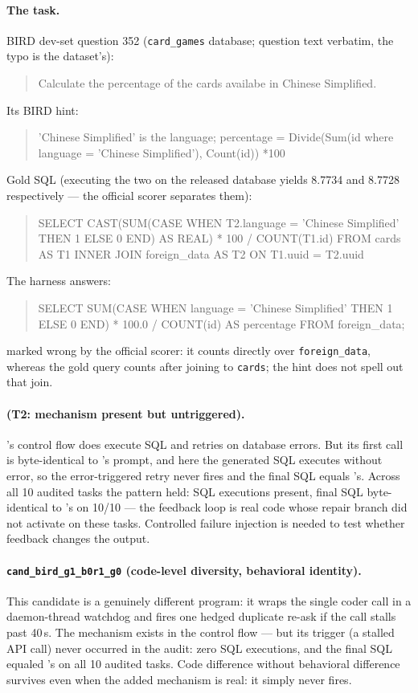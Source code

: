 \paragraph{The task.} BIRD dev-set question 352 (\texttt{card\_games}
database; question text verbatim, the typo is the dataset's):
\begin{quote}\small\ttfamily
Calculate the percentage of the cards availabe in Chinese Simplified.
\end{quote}
Its BIRD hint:
\begin{quote}\small\ttfamily
'Chinese Simplified' is the language; percentage = Divide(Sum(id where
language = 'Chinese Simplified'), Count(id)) *100
\end{quote}
Gold SQL (executing the two on the released database yields 8.7734 and
8.7728 respectively --- the official scorer separates them):
\begin{quote}\small\ttfamily
SELECT CAST(SUM(CASE WHEN T2.language = 'Chinese Simplified' THEN 1 ELSE 0
END) AS REAL) * 100 / COUNT(T1.id) FROM cards AS T1 INNER JOIN foreign\_data
AS T2 ON T1.uuid = T2.uuid
\end{quote}
The \bare{} harness answers:
\begin{quote}\small\ttfamily
SELECT SUM(CASE WHEN language = 'Chinese Simplified' THEN 1 ELSE 0 END) *
100.0 / COUNT(id) AS percentage FROM foreign\_data;
\end{quote}
marked wrong by the official scorer: it counts directly over
\texttt{foreign\_data}, whereas the gold query counts after joining to
\texttt{cards}; the hint does not spell out that join.

\paragraph{\react{} (T2: mechanism present but untriggered).} \react's control
flow does execute SQL and retries on database errors. But its first call is
byte-identical to \bare's prompt, and here the generated SQL executes without
error, so the error-triggered retry never fires and the final SQL equals
\bare's. Across all 10 audited tasks the pattern held: SQL executions
present, final SQL byte-identical to \bare's on 10/10 --- the feedback loop
is real code whose repair branch did not activate on these tasks. Controlled
failure injection is needed to test whether feedback changes the output.

\paragraph{\texttt{cand\_bird\_g1\_b0r1\_g0} (code-level diversity,
behavioral identity).} This candidate is a genuinely different program: it
wraps the single coder call in a daemon-thread watchdog and fires one hedged
duplicate re-ask if the call stalls past 40\,s. The mechanism exists in the
control flow --- but its trigger (a stalled API call) never occurred in the
audit: zero SQL executions, and the final SQL equaled \bare's on all 10
audited tasks. Code difference without behavioral difference survives even
when the added mechanism is real: it simply never fires.

